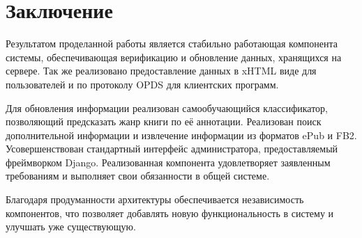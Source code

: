 \section{Заключение}

Результатом проделанной работы является стабильно работающая компонента системы, обеспечивающая верификацию и обновление данных, хранящихся на сервере. Так же реализовано предоставление данных в xHTML виде для пользователей и по протоколу OPDS для клиентских программ. 

Для обновления информации реализован самообучающийся классификатор, позволяющий предсказать жанр книги по её аннотации. Реализован поиск дополнительной информации и извлечение информации из форматов ePub и FB2. Усовершенствован стандартный интерфейс администратора, предоставляемый фреймворком Django. Реализованная компонента удовлетворяет заявленным требованиям и выполняет свои обязанности в общей системе. 

Благодаря продуманности архитектуры обеспечивается независимость компонентов, что позволяет добавлять новую функциональность в систему и улучшать уже существующую.

\newpage